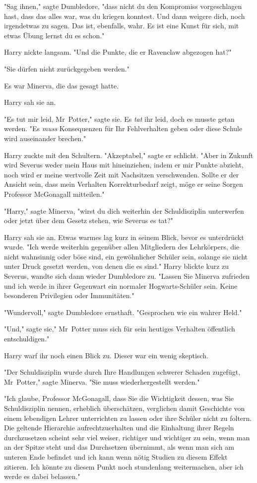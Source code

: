{"Sag ihnen," sagte Dumbledore, "dass nicht du den Kompromiss vorgeschlagen hast, dass das alles war, was du kriegen konntest. Und dann weigere dich, noch irgendetwas zu sagen. Das ist, ebenfalls, wahr. Es ist eine Kunst für sich, mit etwas Übung lernst du es schon."

Harry nickte langsam. "Und die Punkte, die er Ravenclaw abgezogen hat?"

"Sie dürfen nicht zurückgegeben werden."

Es war Minerva, die das gesagt hatte.

Harry sah sie an.

"Es tut mir leid, Mr~Potter," sagte sie. Es \emph{tat} ihr leid, doch es musste getan werden. "Es \emph{muss} Konsequenzen für Ihr Fehlverhalten geben oder diese Schule wird auseinander brechen."

Harry zuckte mit den Schultern. "Akzeptabel," sagte er schlicht. "Aber in Zukunft wird Severus weder mein Haus mit hineinziehen, indem er mir Punkte abzieht, noch wird er meine wertvolle Zeit mit Nachsitzen verschwenden. Sollte er der Ansicht sein, dass mein Verhalten Korrekturbedarf zeigt, möge er seine Sorgen Professor McGonagall mitteilen."

"Harry," sagte Minerva, "wirst du dich weiterhin der Schuldisziplin unterwerfen oder jetzt über dem Gesetz stehen, wie Severus es tat?"

Harry sah sie an. Etwas warmes lag kurz in seinem Blick, bevor es unterdrückt wurde. "Ich werde weiterhin gegenüber allen Mitgliedern des Lehrkörpers, die nicht wahnsinnig oder böse sind, ein gewöhnlicher Schüler sein, solange sie nicht unter Druck gesetzt werden, von denen die es sind." Harry blickte kurz zu Severus, wandte sich dann wieder Dumbledore zu. "Lassen Sie Minerva zufrieden und ich werde in ihrer Gegenwart ein normaler Hogwarts-Schüler sein. Keine besonderen Privilegien oder Immunitäten."

"Wundervoll," sagte Dumbledore ernsthaft. "Gesprochen wie ein wahrer Held."

"Und," sagte sie," Mr~Potter muss sich für sein heutiges Verhalten öffentlich entschuldigen."

Harry warf ihr noch einen Blick zu. Dieser war ein wenig skeptisch.

"Der Schuldisziplin wurde durch Ihre Handlungen schwerer Schaden zugefügt, Mr~Potter," sagte Minerva. "Sie muss wiederhergestellt werden."

"Ich glaube, Professor McGonagall, dass Sie die Wichtigkeit dessen, was Sie Schuldisziplin nennen, erheblich überschätzen, verglichen damit Geschichte von einem lebendigen Lehrer unterrichten zu lassen oder ihre Schüler nicht zu foltern. Die geltende Hierarchie aufrechtzuerhalten und die Einhaltung ihrer Regeln durchzusetzen scheint sehr viel weiser, richtiger und wichtiger zu sein, wenn man an der Spitze steht und das Durchsetzen übernimmt, als wenn man sich am unteren Ende befindet und ich kann wenn nötig Studien zu diesem Effekt zitieren. Ich könnte zu diesem Punkt noch stundenlang weitermachen, aber ich werde es dabei belassen."

}
